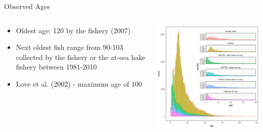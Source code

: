 \documentclass[pdf]{beamer}\usepackage[]{graphicx}\usepackage[]{color}
\begin{document}
\begin{frame}{Observed Ages}
  \begin{columns}
    \begin{column}{0.35\textwidth}
      \begin{itemize}
      \item Oldest age: 120 by the fishery (2007)
      \item Next oldest fish range from 90-103 collected by the fishery or the at-sea hake fishery between 1981-2010
      \item Love et al. (2002) - maximum age of 100
      \end{itemize}
    \end{column}
    \begin{column}{0.65\textwidth}
      \includegraphics[scale = 0.45]{figures/pop2017_agesbysource.png}
    \end{column}
  \end{columns}
\end{frame}
\end{document}
